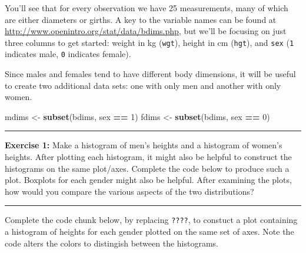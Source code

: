 \documentclass[]{book}
\newenvironment{Shaded}{\begin{snugshade}}{\end{snugshade}}
\newcommand{\DecValTok}[1]{\textcolor[rgb]{0.00,0.00,0.81}{#1}}
\newcommand{\KeywordTok}[1]{\textcolor[rgb]{0.13,0.29,0.53}{\textbf{#1}}}
\newcommand{\NormalTok}[1]{#1}
\newcommand{\OperatorTok}[1]{\textcolor[rgb]{0.81,0.36,0.00}{\textbf{#1}}}
\newcommand{\StringTok}[1]{\textcolor[rgb]{0.31,0.60,0.02}{#1}}
\theoremstyle{definition}
\theoremstyle{definition}
\theoremstyle{definition}
\theoremstyle{remark}
\begin{document}
You'll see that for every observation we have 25 measurements, many of
which are either diameters or girths. A key to the variable names can be
found at \url{http://www.openintro.org/stat/data/bdims.php}, but we'll
be focusing on just three columns to get started: weight in kg
(\texttt{wgt}), height in cm (\texttt{hgt}), and \texttt{sex}
(\texttt{1} indicates male, \texttt{0} indicates female).

Since males and females tend to have different body dimensions, it will
be useful to create two additional data sets: one with only men and
another with only women.

\begin{Shaded}
\begin{Highlighting}[]
\NormalTok{mdims <-}\StringTok{ }\KeywordTok{subset}\NormalTok{(bdims, sex }\OperatorTok{==}\StringTok{ }\DecValTok{1}\NormalTok{)}
\NormalTok{fdims <-}\StringTok{ }\KeywordTok{subset}\NormalTok{(bdims, sex }\OperatorTok{==}\StringTok{ }\DecValTok{0}\NormalTok{)}
\end{Highlighting}
\end{Shaded}

\begin{center}\rule{0.5\linewidth}{\linethickness}\end{center}

\textbf{Exercise 1:} Make a histogram of men's heights and a histogram
of women's heights. After plotting each histogram, it might also be
helpful to construct the histograms on the same plot/axes. Complete the
code below to produce such a plot. Boxplots for each gender might also
be helpful. After examining the plots, how would you compare the various
aspects of the two distributions?

\begin{center}\rule{0.5\linewidth}{\linethickness}\end{center}

Complete the code chunk below, by replacing \texttt{????}, to constuct a
plot containing a histogram of heights for each gender plotted on the
same set of axes. Note the code alters the colors to distingish between
the histograms.
\end{document}
